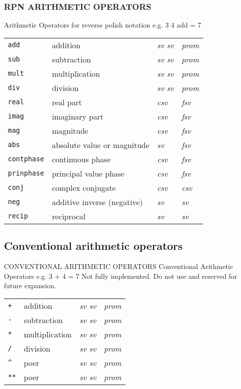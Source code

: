 \subsubsection[RPN arithmetic operators]{RPN ARITHMETIC OPERATORS}
Arithmetic Operators for reverse polish notation
e.g. 3 4 add = 7

\begin{tabular}{p{.8in}p{2.5in}p{1.0in}p{.75in}}
{\tt add} & addition & {\it sv \newline sv} & {\it prom} \\
{\tt sub} & subtraction	& {\it sv \newline sv} & {\it prom} \\
{\tt mult} & multiplication & {\it sv \newline sv} & {\it prom} \\
{\tt div} & division & {\it sv \newline sv} & {\it prom} \\
{\tt real} & real part & {\it csv} & {\it fsv} \\
{\tt imag} & imaginary part & {\it csv} & {\it fsv} \\
{\tt mag} & magnitude & {\it csv} & {\it fsv} \\
{\tt abs} & absolute value or magnitude & {\it sv} & {\it fsv} \\
{\tt contphase} & continuous phase & {\it csv} & {\it fsv} \\
{\tt prinphase} & principal value phase & {\it csv} & {\it fsv} \\
{\tt conj} & complex conjugate & {\it csv} & {\it csv} \\
{\tt neg} & additive inverse (negative) & {\it sv} & {\it sv} \\
{\tt recip} & reciprocal & {\it sv} & {\it sv}
\end{tabular}

\subsection{Conventional arithmetic operators}{CONVENTIONAL
ARITHMETIC OPERATORS}
Conventional Arithmetic Operators 
e.g. 3 + 4 = 7
Not fully implemented. Do not use and reserved for future expansion.

\begin{tabular}{p{.8in}p{2.5in}p{1.0in}p{.75in}}
{\verb:+:} & addition & {\it sv \newline sv} & {\it prom} \\
{\verb:-:} & subtraction & {\it sv \newline sv} & {\it prom} \\
{\verb:*:} & multiplication & {\it sv \newline sv} & {\it prom} \\
{\verb:/:} & division & {\it sv \newline sv} & {\it prom} \\
{\verb:^:} & poer & {\it sv \newline sv} & {\it prom} \\
{\verb:**:} & poer & {\it sv \newline sv} & {\it prom} \\
\end{tabular}

